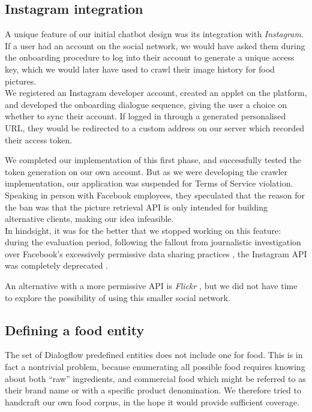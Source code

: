 \subsection{Instagram integration}
A unique feature of our initial chatbot design was its integration with \textit{Instagram}. If a user had an account on the social network, we would have asked them during the onboarding procedure to log into their account to generate a unique access key, which we would later have used to crawl their image history for food pictures.\\
We registered an Instagram developer account, created an applet on the platform, and developed the onboarding dialogue sequence, giving the user a choice on whether to sync their account. If logged in through a generated personalised URL, they would be redirected to a custom address on our server which recorded their access token.

We completed our implementation of this first phase, and successfully tested the token generation on our own account. But as we were developing the crawler implementation, our application was suspended for Terms of Service violation. Speaking in person with Facebook employees, they speculated that the reason for the ban was that the picture retrieval API is only intended for building alternative clients, making our idea infeasible. \\
In hindsight, it was for the better that we stopped working on this feature: during the evaluation period, following the fallout from journalistic investigation over Facebook's excessively permissive data sharing practices \cite{cambridgeanalytica}, the Instagram API was completely deprecated \cite{instagramdeprecated}.

An alternative with a more permissive API is \textit{Flickr} \cite{flickr}, but we did not have time to explore the possibility of using this smaller social network.
\subsection{Defining a food entity}
The set of Dialogflow predefined entities does not include one for food. This is in fact a nontrivial problem, because enumerating all possible food requires knowing about both ``raw'' ingredients, and commercial food which might be referred to as their brand name or with a specific product denomination. We therefore tried to handcraft our own food corpus, in the hope it would provide sufficient coverage.

